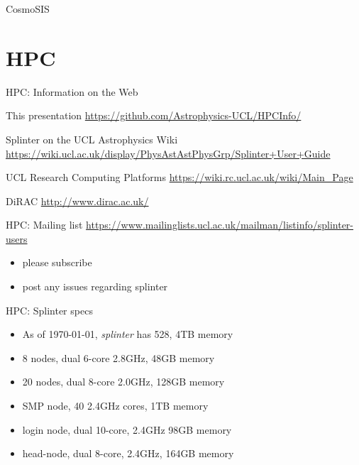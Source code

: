 \documentclass{beamer}
\begin{document}
\begin{frame}{CosmoSIS}

\end{frame}

\section{HPC}

\begin{frame}{HPC: Information on the Web}
  \begin{block}{This presentation}
    \url{https://github.com/Astrophysics-UCL/HPCInfo/}
  \end{block}

    \begin{block}{Splinter on the UCL Astrophysics Wiki}
    \url{https://wiki.ucl.ac.uk/display/PhysAstAstPhysGrp/Splinter+User+Guide}
  \end{block}

  \begin{block}{UCL Research Computing Platforms}
    \url{https://wiki.rc.ucl.ac.uk/wiki/Main_Page}
  \end{block}

  \begin{block}{DiRAC}
    \url{http://www.dirac.ac.uk/}
  \end{block}

\end{frame}

\begin{frame}{HPC: Mailing list}
	\url{https://www.mailinglists.ucl.ac.uk/mailman/listinfo/splinter-users}
	\bigskip
	\begin{itemize}
		\item please subscribe
		\item post any issues regarding splinter
	\end{itemize}
\end{frame}

\begin{frame}{HPC: Splinter specs}
	\begin{itemize}
		\item As of \today, \emph{splinter} has 528, 4TB memory
		\item 8 nodes, dual 6-core 2.8GHz, 48GB memory 
		\item 20 nodes, dual 8-core 2.0GHz, 128GB memory
		\item SMP node, 40 2.4GHz cores, 1TB memory
		\item login node, dual 10-core, 2.4GHz 98GB memory
		\item head-node, dual 8-core, 2.4GHz, 164GB memory
	\end{itemize}
\end{frame}
\end{document}
